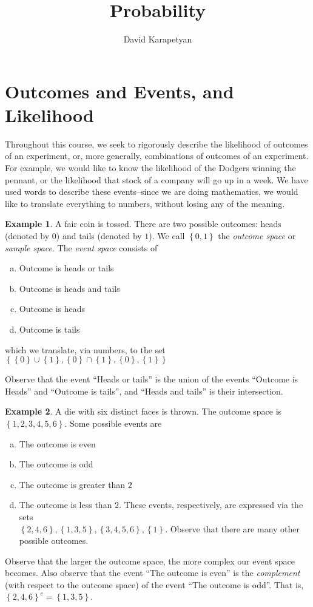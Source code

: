 \documentclass[12pt]{article}
\theoremstyle{plain}
\theoremstyle{definition}
\newtheorem*{example}{Example}
\theoremstyle{remark}
\numberwithin{equation}{section}  %
\begin{document}
\title{Probability}
\author{David Karapetyan}
\date{}
\maketitle
\newpage
\setcounter{tocdepth}{2}
\tableofcontents
\newpage
\section{Outcomes and Events, and Likelihood}
	Throughout this course, we seek to rigorously describe the likelihood of
	outcomes of an experiment, or, more generally, combinations of outcomes of an experiment.
	For example, we would like to know the likelihood of the Dodgers
	winning the pennant, or the likelihood that stock of a company will go up
	in a week. We have used words to describe these events--since we are doing
	mathematics, we would like to translate everything to numbers, without losing
	any of the meaning.
\begin{example}
A fair coin is tossed. There are two possible outcomes: heads (denoted by $0$) 
and tails (denoted by $1$). We call $ \left\{ 0,1 \right\} $ the \emph{outcome
space} or \emph{sample space}. The \emph{event space} consists of
\begin{enumerate}[a)]
\item Outcome is heads or tails
\item Outcome is heads and tails
\item Outcome is heads
\item Outcome is tails
\end{enumerate}
which we translate, via numbers, to the set $ \left\{ \left\{ 0 \right\} \cup
\left\{ 1 \right\}, \left\{ 0 \right\} \cap \left\{ 1 \right\} , \left\{ 0
\right\} , \left\{ 1 \right\} \right \} $
\end{example}	
Observe that the event ``Heads or tails'' is the union of the events
``Outcome is Heads'' and ``Outcome is tails'', and ``Heads and tails'' is
their intersection.
\begin{example}
A die with six distinct faces is thrown. The outcome space is
$ \left\{ 1, 2, 3, 4, 5, 6 \right\} $. Some possible events are
\begin{enumerate}[a)]
\item The outcome is even
\item The outcome is odd
\item The outcome is greater than $2$
\item The outcome is less than $2$.
These events, respectively, are expressed via the sets \\
$ \left\{ 2, 4, 6 \right\} , \left\{ 1,3,5 \right\} , \left\{ 3, 4, 5, 6
\right\}, \left\{ 1 \right\} $.
Observe that there are many other possible outcomes.
\end{enumerate}
\end{example}
Observe that the larger the outcome space, the more complex
our event space becomes. Also observe that the event
``The outcome is even'' is the \emph{complement} (with respect to the
outcome space) of
the event ``The outcome is odd''. That is, $ \left\{ 2,4,6 \right\}^c
= \left\{ 1,3,5 \right\} $.
\end{document}
